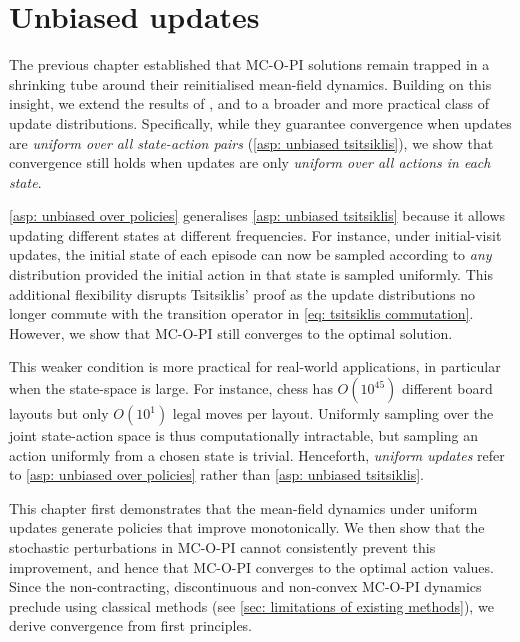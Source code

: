 \chapter{Unbiased updates}
\label{ch: unbiased}



The previous chapter established that MC-O-PI solutions remain trapped in a shrinking tube around their reinitialised mean-field dynamics.
Building on this insight, we extend
the results of \citet{Tsitsiklis2002OnIteration}, \citet{Chen2018OnProblem} and \citet{Liu2021OnStarts} to a broader and more practical class of update distributions.
Specifically, while they guarantee convergence when updates are \textit{uniform over all state-action pairs} (\autoref{asp: unbiased tsitsiklis}), we show that convergence still holds when updates are only \textit{uniform over all actions in each state}.


\vspace{-0.6cm}

\autoref{asp: unbiased over policies} generalises \autoref{asp: unbiased tsitsiklis} because it allows updating different states at different frequencies.
For instance, under initial-visit updates, the initial state of each episode can now be sampled according to \textit{any} distribution provided the initial action in that state is sampled uniformly.
This additional flexibility disrupts Tsitsiklis' proof as the update distributions no longer commute with the transition operator in \eqref{eq: tsitsiklis commutation}. However, we show that MC-O-PI still converges to the optimal solution.

This weaker condition is more practical for real-world applications, in particular when the state-space is large.
For instance, chess has $O(10^{45})$ different board layouts but only $O (10^1)$ legal moves per layout.
Uniformly sampling over the joint state-action space is thus computationally intractable, but sampling an action uniformly from a chosen state is trivial.
Henceforth, \textit{uniform updates} refer to \autoref{asp: unbiased over policies} rather than \autoref{asp: unbiased tsitsiklis}.


This chapter
first demonstrates that the mean-field dynamics under uniform updates generate policies that improve monotonically.
We then show that the stochastic perturbations in MC-O-PI cannot consistently prevent this improvement, and hence that MC-O-PI converges to the optimal action values.
Since the non-contracting, discontinuous and non-convex MC-O-PI dynamics preclude using classical methods (see \autoref{sec: limitations of existing methods}),
we derive convergence from first principles.

